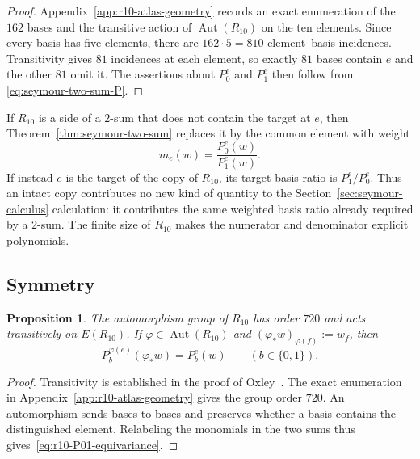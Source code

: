 \documentclass[11pt]{article}
\numberwithin{equation}{section}
\newtheorem{proposition}[definition]{Proposition}
\theoremstyle{remark}
\begin{document}
\begin{proof}
Appendix~\ref{app:r10-atlas-geometry} records an exact enumeration of the
$162$ bases and the transitive action of $\operatorname{Aut}(R_{10})$ on the
ten elements.  Since every basis has five elements, there are
$162\cdot5=810$ element--basis incidences.  Transitivity gives $81$
incidences at each element, so exactly $81$ bases contain $e$ and the other
$81$ omit it.  The assertions about $P_0^e$ and $P_1^e$ then follow from
\eqref{eq:seymour-two-sum-P}.
\end{proof}

If $R_{10}$ is a side of a $2$-sum that does not contain the target at $e$, then
Theorem~\ref{thm:seymour-two-sum} replaces it by the common element with
weight
\begin{equation}
    m_e(w)=\frac{P_0^e(w)}{P_1^e(w)}.
    \label{eq:r10-effective-weight}
\end{equation}
If instead $e$ is the target of the copy of $R_{10}$, its target-basis ratio
is $P_1^e/P_0^e$. Thus an intact copy contributes no new kind of quantity to
the Section~\ref{sec:seymour-calculus} calculation: it contributes the same
weighted basis ratio already required by a $2$-sum. The finite size of
$R_{10}$ makes the numerator and denominator explicit polynomials.

\subsection{Symmetry}
\label{subsec:r10-symmetry}

\begin{proposition}
\label{prop:r10-symmetry}
The automorphism group of $R_{10}$ has order $720$ and acts transitively on
$E(R_{10})$.  If $\varphi\in\operatorname{Aut}(R_{10})$ and
$(\varphi_*w)_{\varphi(f)}:=w_f$, then
\begin{equation}
    P_b^{\varphi(e)}(\varphi_*w)=P_b^e(w)
    \qquad (b\in\{0,1\}).
    \label{eq:r10-P01-equivariance}
\end{equation}
\end{proposition}

\begin{proof}
Transitivity is established in the proof of
Oxley~\cite[Lem.~6.6.9]{Oxley2011}. The exact enumeration in
Appendix~\ref{app:r10-atlas-geometry} gives the group order $720$. An
automorphism sends bases to bases and preserves whether a basis contains the
distinguished element. Relabeling the monomials in the two sums thus
gives~\eqref{eq:r10-P01-equivariance}.
\end{proof}
\end{document}
